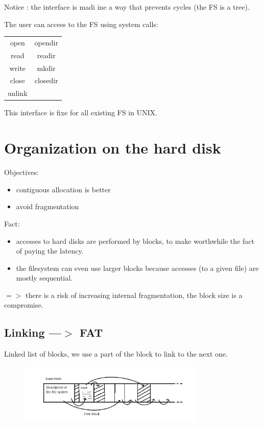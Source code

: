 \documentclass[a4paper,10pt]{report}
\newlength{\larg}
\begin{document}
  Notice : the interface is madi ine a way that prevents cycles (the FS is a tree).
  
  The user can access to the FS using system calls:

    \begin{center}
      \begin{tabular}{c|c}
         open & opendir \\
         read & readir \\
         write & mkdir \\
         close & closedir \\
         unlink & \\
      \end{tabular}
    \end{center}
This interface is fixe for all existing FS in UNIX.

\section{Organization on the hard disk}

Objectives:

\begin{itemize}
  \item contiguous allocation is better
  \item avoid fragmentation
\end{itemize}

Fact:

\begin{itemize}
  \item accesses to hard disks are performed by blocks, to make worthwhile the fact of paying the latency.
  \item the filesystem can even use larger blocks because accesses (to a given file) are mostly sequential.
  
\end{itemize}

$=>$ there is a risk of increasing internal fragmentation, the block size is a compromise.

\subsection{Linking ---$>$ FAT}

Linked list of blocks, we use a part of the block to link to the next one.

 \begin{figure}[h!]
  \begin{center}
    \includegraphics[width=0.8\textwidth]{fat.jpg}
  \end{center}
\end{figure}
\end{document}
